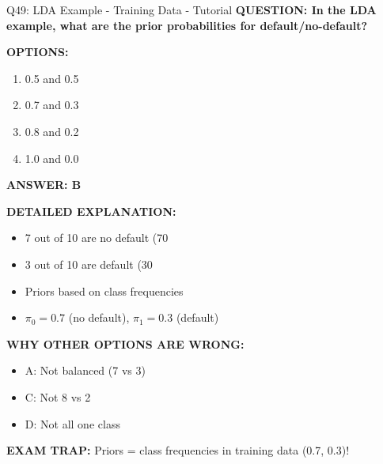 \documentclass[8pt]{beamer}
\begin{document}
	\begin{frame}{Q49: LDA Example - Training Data - Tutorial}
		\fontsize{6.5}{7.5}\selectfont
		\textbf{QUESTION: In the LDA example, what are the prior probabilities for default/no-default?}
		
		\vspace{0.1cm}
		\textbf{OPTIONS:}
		\begin{enumerate}
			\item 0.5 and 0.5
			\item 0.7 and 0.3
			\item 0.8 and 0.2
			\item 1.0 and 0.0
		\end{enumerate}
		
		\vspace{0.1cm}
		\textcolor{myblue}{\textbf{ANSWER: B}}
		
		\vspace{0.1cm}
		\textbf{DETAILED EXPLANATION:}
		\begin{itemize}
			\item 7 out of 10 are no default (70%
			\item 3 out of 10 are default (30%
			\item Priors based on class frequencies
			\item $\pi_0 = 0.7$ (no default), $\pi_1 = 0.3$ (default)
		\end{itemize}
		
		\vspace{0.1cm}
		\textcolor{myred}{\textbf{WHY OTHER OPTIONS ARE WRONG:}}
		\begin{itemize}
			\item \textcolor{myred}{A:} Not balanced (7 vs 3)
			\item \textcolor{myred}{C:} Not 8 vs 2
			\item \textcolor{myred}{D:} Not all one class\end{itemize}
		
		\textcolor{myred}{\textbf{EXAM TRAP:}} Priors = \textcolor{myblue}{class frequencies in training data} (0.7, 0.3)!
	\end{frame}
	
\end{document}
